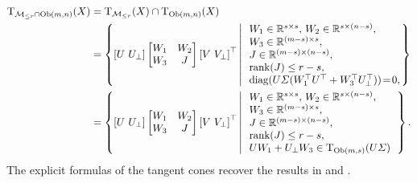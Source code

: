 \begin{equation*}
\begin{aligned}
\mathrm{T}_{\mathcal{M}_{\le r}\cap\mathrm{Ob}(m,n)}(X)&= \mathrm{T}_{\mathcal{M}_{\le r}}(X)\cap\mathrm{T}_{\mathrm{Ob}(m,n)}(X)
\\
&=\left\{ {\left[ U\,\,U_{\bot} \right] \left[ \begin{matrix}
W_1 &		W_2\\
W_3&		J\\
\end{matrix} \right] \left[ V\,\,V_{\bot} \right] ^{\top}\left|\,\begin{array}{l}
W_1\in\mathbb{R}^{s\times s},\, W_2\in\mathbb{R} ^{s\times \left( n-s \right)},
\\
W_3\in\mathbb{R} ^{\left( m-s \right) \times s},
\\
J\in \mathbb{R}^{\left( m-s \right) \times \left( n-s \right)},
\\
\operatorname{rank}(J)\le r-s,
\\
\operatorname{diag}(U\varSigma(W_1^\top U^\top+W_3^\top U_\bot^\top))\!=\!0,\!\!\!
\end{array}
\right.} \right\}
\\
&=\left\{ {\left[ U\,\,U_{\bot} \right] \left[ \begin{matrix}
W_1 &	W_2\\
W_3&		J\\
\end{matrix} \right] \left[ V\,\,V_{\bot} \right] ^{\top}\left|\,\begin{array}{l}
W_1\in\mathbb{R}^{s\times s},\, W_2\in\mathbb{R} ^{s\times \left( n-s \right)},
\\
W_3\in\mathbb{R} ^{\left( m-s \right) \times s},
\\
J\in \mathbb{R}^{\left( m-s \right) \times \left( n-s \right)},
\\
\operatorname{rank}(J)\le r-s,
\\
UW_1+U_\bot W_3\in\mathrm{T}_{\mathrm{Ob}(m,s)}(U\varSigma)
\end{array}
\right.} \right\}.
\end{aligned}
\end{equation*}
The explicit formulas of the tangent cones recover the results in \cite[Theorem~6.1]{cason2013iterative} and \cite[Theorem~1]{yang2025spacedecouple}.

